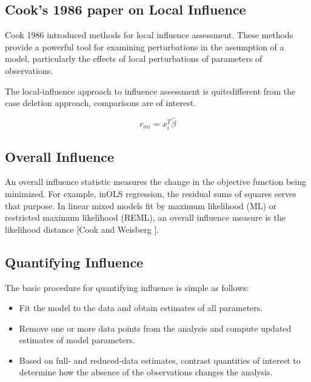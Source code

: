\documentclass[12pt, a4paper]{article}
\begin{document}
			
			
			\subsection{Cook's 1986 paper on Local Influence}%
			Cook 1986 introduced methods for local influence assessment. These methods provide a powerful tool for examining perturbations in the assumption of a model, particularly the effects of local perturbations of parameters of observations.
			
			The local-influence approach to influence assessment is quitedifferent from the case deletion approach, comparisons are of
			interest.
			
			
			
			
			\begin{equation}
			r_{mi}=x^{T}_{i}\hat{\beta}
			\end{equation}
			
			
			
			
			
			
			
			\subsection{Overall Influence}
			An overall influence statistic measures the change in the objective function being minimized. For example, inOLS regression, the residual sums of squares serves that purpose. In linear mixed models fit by
			 maximum likelihood (ML) or  restricted maximum likelihood (REML), an overall influence measure is the  likelihood distance [Cook and Weisberg ].
			
			\subsection{Quantifying Influence}  %
			
			The basic procedure for quantifying influence is simple as follows:
			
			\begin{itemize}
				\item Fit the model to the data and obtain estimates of all parameters.
				\item Remove one or more data points from the analysis and compute updated estimates of model parameters.
				\item Based on full- and reduced-data estimates, contrast quantities of interest to determine how the absence of the observations changes the analysis.
			\end{itemize}
			
\end{document}
